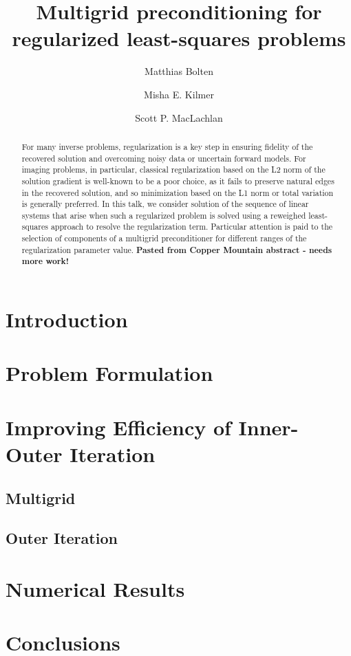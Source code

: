 \documentclass[review]{siamart171218}
\title{Multigrid preconditioning for regularized least-squares problems}
\author{Matthias Bolten \and Misha E. Kilmer \and Scott P. MacLachlan}
\begin{document}
\maketitle

\begin{abstract}
For many inverse problems, regularization is a key step in ensuring
fidelity of the recovered solution and overcoming noisy data or
uncertain forward models. For imaging problems, in particular,
classical regularization based on the L2 norm of the solution gradient
is well-known to be a poor choice, as it fails to preserve natural
edges in the recovered solution, and so minimization based on the L1
norm or total variation is generally preferred. In this talk, we
consider solution of the sequence of linear systems that arise when
such a regularized problem is solved using a reweighed least-squares
approach to resolve the regularization term. Particular attention is
paid to the selection of components of a multigrid preconditioner for
different ranges of the regularization parameter value.  {\bf Pasted
  from Copper Mountain abstract - needs more work!}
\end{abstract}


\section{Introduction}


\section{Problem Formulation}


\section{Improving Efficiency of Inner-Outer Iteration}


\subsection{Multigrid}\label{sec:multigrid}



\subsection{Outer Iteration}



\section{Numerical Results}\label{sec:numerical}


\section{Conclusions}

 
\end{document}
